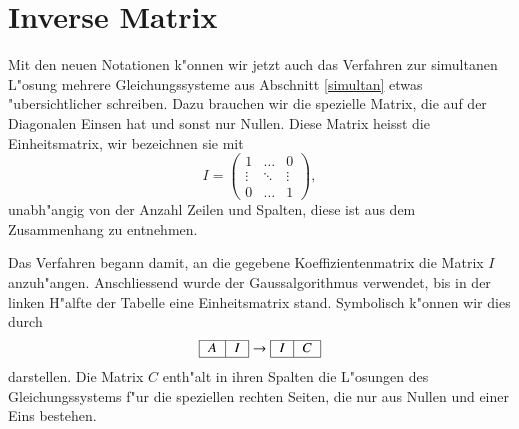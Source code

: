 \section{Inverse Matrix}
Mit den neuen Notationen k"onnen wir jetzt auch das Verfahren zur simultanen
L"osung mehrere Gleichungssysteme aus Abschnitt \ref{simultan} etwas
"ubersichtlicher schreiben.
Dazu brauchen wir die spezielle Matrix, die auf der Diagonalen Einsen hat
und sonst nur Nullen.
Diese Matrix heisst die Einheitsmatrix, wir bezeichnen sie mit
\[
I=
\begin{pmatrix}1&\dots&0\\
\vdots&\ddots&\vdots\\
0&\dots&1
\end{pmatrix},
\]
unabh"angig von der Anzahl Zeilen und Spalten, diese ist aus dem Zusammenhang
zu entnehmen.

Das Verfahren begann damit, an die gegebene Koeffizientenmatrix die Matrix $I$
anzuh"angen.
Anschliessend wurde der Gaussalgorithmus verwendet, bis in
der linken H"alfte der Tabelle eine Einheitsmatrix stand.
Symbolisch k"onnen wir dies durch
\begin{equation}
\begin{tabular}{|c|c|}\hline
$A$&$I$\\
\hline
\end{tabular}
\rightarrow
\begin{tabular}{|c|c|}\hline
$I$&$C$\\
\hline
\end{tabular}
\label{gaussinverse}
\end{equation}
darstellen.
Die Matrix $C$ enth"alt in ihren Spalten die L"osungen des
Gleichungssystems f"ur die speziellen rechten Seiten, die nur aus Nullen
und einer Eins bestehen.

